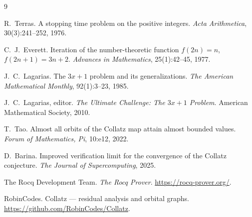 \documentclass[11pt,a4paper]{article}
\theoremstyle{plain}
\theoremstyle{definition}
\begin{document}
\begin{thebibliography}{9}

R.~Terras.
\newblock A stopping time problem on the positive integers.
\newblock \emph{Acta Arithmetica}, 30(3):241--252, 1976.

C.~J.~Everett.
\newblock Iteration of the number-theoretic function $f(2n) = n$,
  $f(2n+1) = 3n+2$.
\newblock \emph{Advances in Mathematics}, 25(1):42--45, 1977.

J.~C.~Lagarias.
\newblock The $3x+1$ problem and its generalizations.
\newblock \emph{The American Mathematical Monthly}, 92(1):3--23, 1985.

J.~C.~Lagarias, editor.
\newblock \emph{The Ultimate Challenge: The $3x+1$ Problem}.
\newblock American Mathematical Society, 2010.

T.~Tao.
\newblock Almost all orbits of the Collatz map attain almost bounded values.
\newblock \emph{Forum of Mathematics, Pi}, 10:e12, 2022.

D.~Barina.
\newblock Improved verification limit for the convergence of the Collatz
  conjecture.
\newblock \emph{The Journal of Supercomputing}, 2025.

The Rocq Development Team.
\newblock \emph{The Rocq Prover}.
\newblock \url{https://rocq-prover.org/}.

RobinCodes.
\newblock Collatz --- residual analysis and orbital graphs.
\newblock \url{https://github.com/RobinCodes/Collatz}.

\end{thebibliography}
\end{document}
